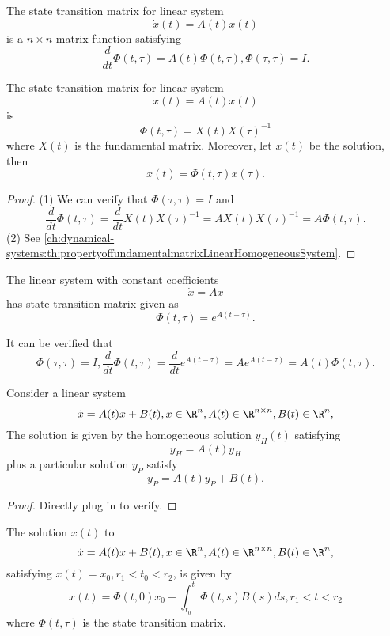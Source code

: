 \begin{refsection}
\begin{definition}\cite[114]{luenberger1979introduction}\label{ch:dynamical-systems:def:statetransitionmatrix}
	The state transition matrix for linear system
	$$\dot{x}(t) = A(t)x(t)$$
	is a $n\times n$ matrix function satisfying
	$$\frac{d}{dt}\Phi(t,\tau) = A(t)\Phi(t,\tau), \Phi(\tau,\tau) = I.$$
\end{definition}

\begin{lemma}\label{ch:dynamical-systems:th:linearSystemStateTransitionMatrixViaFundamentalMatrix}
	The state transition matrix for linear system
	$$\dot{x}(t) = A(t)x(t)$$
	is 
	$$\Phi(t,\tau) = X(t)X(\tau)^{-1}$$
	where $X(t)$ is the fundamental matrix.
	Moreover, let $x(t)$ be the solution, then
	$$x(t) = \Phi(t,\tau) x(\tau).$$ 
\end{lemma}
\begin{proof}
(1) We can verify that $\Phi(\tau,\tau) = I$ and 
$$\frac{d}{dt}\Phi(t,\tau) = \frac{d}{dt}X(t)X(\tau)^{-1} = AX(t)X(\tau)^{-1}  = A\Phi(t,\tau).$$
(2)	See \autoref{ch:dynamical-systems:th:propertyoffundamentalmatrixLinearHomogeneousSystem}.
\end{proof}

\begin{example}
	The linear system with constant coefficients
	$$\dot{x} = Ax$$
	has state transition matrix given as
	$$\Phi(t,\tau) = e^{A(t-\tau)}.$$

It can be verified that $$\Phi(\tau,\tau) = I, \frac{d}{dt}\Phi(t,\tau) =\frac{d}{dt}e^{A(t-\tau)} = Ae^{A(t-\tau)}  = A(t)\Phi(t,\tau).$$	
\end{example}

\begin{theorem}
	Consider a linear system
$$\dot{x} = A(t)x + B(t), x\in \R^n, A(t)\in \R^{n\times n},B(t) \in \R^n,$$
	The solution is given by the  homogeneous solution $y_H(t)$ satisfying
	$$\dot{y}_H = A(t)y_H$$
	 plus a particular solution $y_P$ satisfy
	$$\dot{y}_P = A(t)y_P + B(t).$$
\end{theorem}
\begin{proof}
	Directly plug in to verify.
\end{proof}

\begin{theorem}\label{ch:dynamical-systems:th:generalsolutionlinearsystem}
The solution $x(t)$ to
$$\dot{x} = A(t)x + B(t), x\in \R^n, A(t)\in \R^{n\times n},B(t) \in \R^n,$$
satisfying $x(t) = x_0, r_1<t_0<r_2$, is given by
$$x(t) = \Phi(t,0)x_0 + \int_{t_0}^t \Phi(t,s)B(s)ds, r_1<t<r_2$$
where $\Phi(t,\tau)$ is the state transition matrix.


\end{theorem}
\end{refsection}
